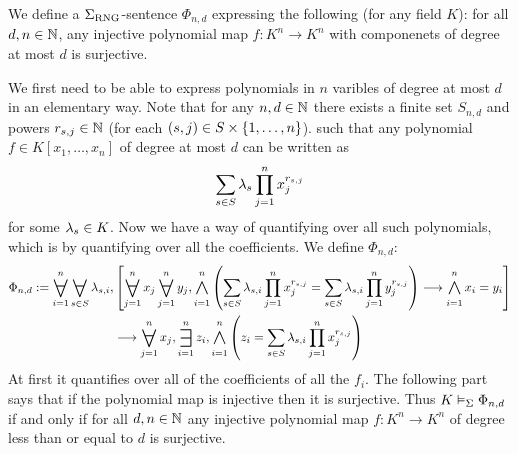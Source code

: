 \begin{dfn}
    We define a $\Sigma_{\mathrm{RNG}}$-sentence $\Phi_{n,d}$ expressing the following
    (for any field $K$):
    for all $d,n \in \mathbb{N}$, any injective polynomial map $f : K^n \to K^n$
    with componenets of degree at most $d$ is surjective.

    We first need to be able to express polynomials in $n$ varibles 
    of degree at most $d$ in an elementary way.
    Note that for any $n,d \in \mathbb{N}$ there exists a finite set $S_{n,d}$
    and powers $r_{s,j}\in \mathbb{N}$ (for each $(s,j) \in S \times \left\{1, \dots, n\right\}$).
    such that any polynomial $f \in K[x_1, \dots, x_n]$
    of degree at most $d$ can be written as
    \[\sum_{s \in S} \lambda_s \prod_{j=1}^n x_j^{r_{s,j}}\]
    for some $\lambda_s \in K$.
    Now we have a way of quantifying over all such polynomials,
    which is by quantifying over all the coefficients.
    We define $\Phi_{n,d}$:
    \begin{align*}
        \Phi_{n,d}:= \bigforall{i = 1}{n} \bigforall{s \in S}{} \la_{s,i},
        &\sqbrkt{\bigforall{j = 1}{n}x_j \bigforall{j = 1}{n}y_j,
        \bigand{i = 1}{n} \brkt{
            \sum_{s \in S}\la_{s,i}\prod_{j = 1}^{n} x_j^{r_{s,j}} = 
            \sum_{s \in S}\la_{s,i}\prod_{j = 1}^{n} y_j^{r_{s,j}}
         }
         \longrightarrow \bigand{i = 1}{n} x_i = y_i}\\
         &\longrightarrow \bigforall{j = 1}{n} x_j, \bigexists{i = 1}{n} z_i,
         \bigand{i=1}{n}\brkt{z_i = \sum_{s \in S} 
         \la_{s,i}\prod_{j = 1}^{n} x_j^{r_{s,j}}
         }
    \end{align*}
    At first it quantifies over all of the coefficients of all the $f_i$.
    The following part says that if the polynomial map is injective then 
    it is surjective.
    Thus $K \vDash_{\Sigma} \Phi_{n,d}$ if and only if
    for all $d,n \in \mathbb{N}$ any injective polynomial map $f : K^n \to K^n$
    of degree less than or equal to $d$ is surjective.
\end{dfn}

